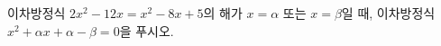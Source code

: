 이차방정식 $2x^2-12x=x^2-8x+5$의 해가 $x=\alpha$ 또는 $x=\beta$일 때, 이차방정식 $x^2+\alpha x+\alpha-\beta=0$을 푸시오. \cond{$\alpha>\beta$}
